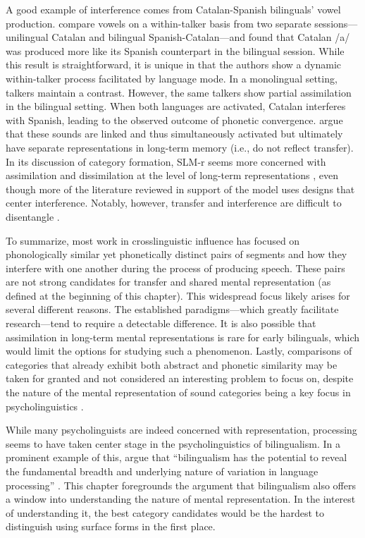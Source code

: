 A good example of interference comes from Catalan-Spanish bilinguals' vowel production. \citet{simonet_2019_convergence} compare vowels on a within-talker basis from two separate sessions---unilingual Catalan and bilingual Spanish-Catalan---and found that Catalan /a/ was produced more like its Spanish counterpart in the bilingual session. While this result is straightforward, it is unique in that the authors show a dynamic within-talker process facilitated by language mode. In a monolingual setting, talkers maintain a contrast. However, the same talkers show partial assimilation in the bilingual setting. When both languages are activated, Catalan interferes with Spanish, leading to the observed outcome of phonetic convergence. \citet{simonet_2019_convergence} argue that these sounds are linked and thus simultaneously activated but ultimately have separate representations in long-term memory (i.e., do not reflect transfer). In its discussion of category formation, SLM-r seems more concerned with assimilation and dissimilation at the level of long-term representations \citep[i.e., transfer;][]{flege_2021_slmr}, even though more of the literature reviewed in support of the model uses designs that center interference. Notably, however, transfer and interference are difficult to disentangle \citep{grosjean_2011_transfer}.

To summarize, most work in crosslinguistic influence has focused on phonologically similar yet phonetically distinct pairs of segments and how they interfere with one another during the process of producing speech. These pairs are not strong candidates for transfer and shared mental representation (as defined at the beginning of this chapter). This widespread focus likely arises for several different reasons. The established paradigms---which greatly facilitate research---tend to require a detectable difference. It is also possible that assimilation in long-term mental representations is rare for early bilinguals, which would limit the options for studying such a phenomenon. Lastly, comparisons of categories that already exhibit both abstract and phonetic similarity may be taken for granted and not considered an interesting problem to focus on, despite the nature of the mental representation of sound categories being a key focus in psycholinguistics \citep{samuel_2020_resist}. 

While many psycholinguists are indeed concerned with representation, processing seems to have taken center stage in the psycholinguistics of bilingualism. In a prominent example of this, \citet{fricke_2019_bilingualism} argue that ``bilingualism has the potential to reveal the fundamental breadth and underlying nature of variation in language processing'' \citeyearpar[][p. 204]{fricke_2019_bilingualism}. This chapter foregrounds the argument that bilingualism also offers a window into understanding the nature of mental representation. In the interest of understanding it, the best category candidates would be the hardest to distinguish using surface forms in the first place. 

